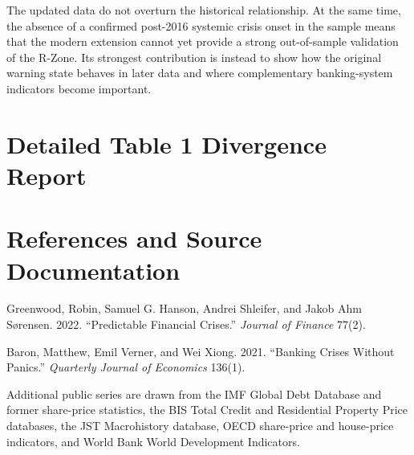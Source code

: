 \documentclass[11pt]{article}
\begin{document}
The updated data do not overturn the historical relationship. At the same
time, the absence of a confirmed post-2016 systemic crisis onset in the
sample means that the modern extension cannot yet provide a strong
out-of-sample validation of the R-Zone. Its strongest contribution is
instead to show how the original warning state behaves in later data and
where complementary banking-system indicators become important.

\appendix
\clearpage
\section{Detailed Table 1 Divergence Report}

\label{tab:table1-comparison}
\scriptsize


\section{References and Source Documentation}

Greenwood, Robin, Samuel G. Hanson, Andrei Shleifer, and Jakob Ahm
S{\o}rensen. 2022. ``Predictable Financial Crises.'' \textit{Journal of
Finance} 77(2).

Baron, Matthew, Emil Verner, and Wei Xiong. 2021. ``Banking Crises Without
Panics.'' \textit{Quarterly Journal of Economics} 136(1).

Additional public series are drawn from the IMF Global Debt Database and
former share-price statistics, the BIS Total Credit and Residential Property
Price databases, the JST Macrohistory database, OECD share-price and house-price
indicators, and World Bank World Development Indicators.
\end{document}
